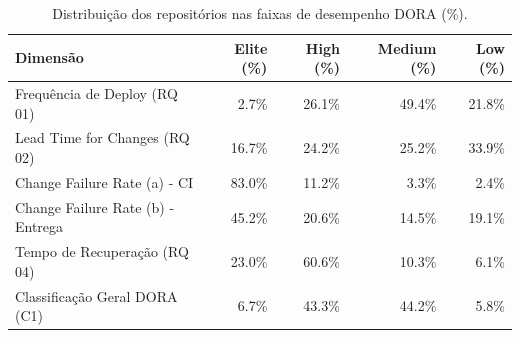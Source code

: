 \begin{table}[ht]
\centering
\caption{Distribuição dos repositórios nas faixas de desempenho DORA (\%).}
\label{tab:dora_tiers}
\begin{tabular}{lrrrr}
\toprule
\textbf{Dimensão} & \textbf{Elite (\%)} & \textbf{High (\%)} & \textbf{Medium (\%)} & \textbf{Low (\%)} \\
\midrule
Frequência de Deploy (RQ 01) & 2.7\% & 26.1\% & 49.4\% & 21.8\% \\
Lead Time for Changes (RQ 02) & 16.7\% & 24.2\% & 25.2\% & 33.9\% \\
Change Failure Rate (a) - CI & 83.0\% & 11.2\% & 3.3\% & 2.4\% \\
Change Failure Rate (b) - Entrega & 45.2\% & 20.6\% & 14.5\% & 19.1\% \\
Tempo de Recuperação (RQ 04) & 23.0\% & 60.6\% & 10.3\% & 6.1\% \\
Classificação Geral DORA (C1) & 6.7\% & 43.3\% & 44.2\% & 5.8\% \\
\bottomrule
\end{tabular}
\end{table}
